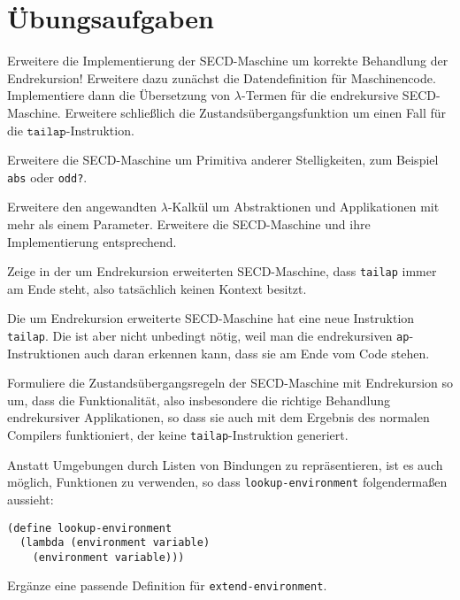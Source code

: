 \section*{Übungsaufgaben}


\begin{aufgabe}\label{aufgabe:secd-endekursiv-implementieren}
  Erweitere die Implementierung der SECD-Maschine um korrekte
  Behandlung der Endrekursion!  Erweitere dazu zunächst die
  Datendefinition für Maschinencode. Implementiere dann die
  Übersetzung von $\lambda$-Termen für die endrekursive SECD-Maschine.
  Erweitere schließlich die Zustandsübergangsfunktion um einen
  Fall für die $\mathtt{tailap}$-Instruktion.
\end{aufgabe}

\begin{aufgabe}\label{aufgabe:prim-arity}
  Erweitere die SECD-Maschine um Primitiva anderer Stelligkeiten,
  zum Beispiel \lstinline{abs} oder \lstinline{odd?}.
\end{aufgabe}

\begin{aufgabe}
  Erweitere den angewandten $\lambda$-Kalkül um Abstraktionen und
  Applikationen mit mehr als einem Parameter.  Erweitere die
  SECD-Maschine und ihre Implementierung entsprechend.
\end{aufgabe}

\begin{aufgabe}
  Zeige in der um Endrekursion erweiterten
  SECD-Maschine, dass \lstinline{tailap} immer am Ende steht, also
  tatsächlich keinen Kontext besitzt.
\end{aufgabe}

\begin{aufgabe}
  Die um Endrekursion erweiterte SECD-Maschine hat eine neue
  Instruktion \lstinline{tailap}.  Die ist aber nicht
  unbedingt nötig, weil man die endrekursiven
  \lstinline{ap}-Instruktionen auch daran erkennen kann, dass sie am
  Ende vom Code stehen.

  Formuliere die Zustandsübergangsregeln der
  SECD-Maschine mit Endrekursion so um, dass die Funktionalität, also
  insbesondere die richtige Behandlung endrekursiver Applikationen, so
  dass sie auch mit dem Ergebnis des normalen Compilers funktioniert,
  der keine \lstinline{tailap}-Instruktion generiert.
  \end{aufgabe}

\begin{aufgabe}
  Anstatt Umgebungen durch Listen von Bindungen zu repräsentieren, ist
  es auch möglich, Funktionen zu verwenden, so dass
  \lstinline{lookup-environment} folgendermaßen aussieht:
\begin{lstlisting}
(define lookup-environment
  (lambda (environment variable)
    (environment variable)))
\end{lstlisting}
  Ergänze eine passende Definition für
  \lstinline{extend-environment}.
\end{aufgabe}

